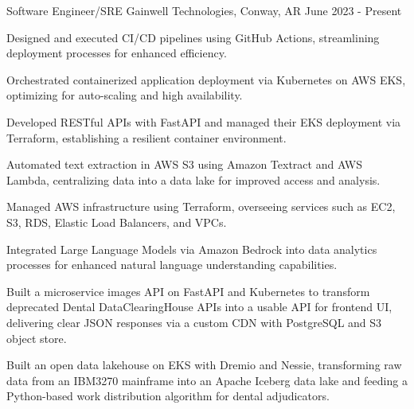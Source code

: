 


\begin{cventries}


\cventry
{Software Engineer/SRE} %
{Gainwell Technologies, Conway, AR} %
{} %
{June 2023 - Present} %
{ %
\begin{cvitems}
\item {Designed and executed CI/CD pipelines using GitHub Actions, streamlining deployment processes for enhanced efficiency.}
\item {Orchestrated containerized application deployment via Kubernetes on AWS EKS, optimizing for auto-scaling and high availability.}
\item {Developed RESTful APIs with FastAPI and managed their EKS deployment via Terraform, establishing a resilient container environment.}
\item {Automated text extraction in AWS S3 using Amazon Textract and AWS Lambda, centralizing data into a data lake for improved access and analysis.}
\item {Managed AWS infrastructure using Terraform, overseeing services such as EC2, S3, RDS, Elastic Load Balancers, and VPCs.}
\item {Integrated Large Language Models via Amazon Bedrock into data analytics processes for enhanced natural language understanding capabilities.}
\item {Built a microservice images API on FastAPI and Kubernetes to transform deprecated Dental DataClearingHouse APIs into a usable API for frontend UI, delivering clear JSON responses via a custom CDN with PostgreSQL and S3 object store.}
\item {Built an open data lakehouse on EKS with Dremio and Nessie, transforming raw data from an IBM3270 mainframe into an Apache Iceberg data lake and feeding a Python-based work distribution algorithm for dental adjudicators.}
\end{cvitems}
}





\end{cventries}
